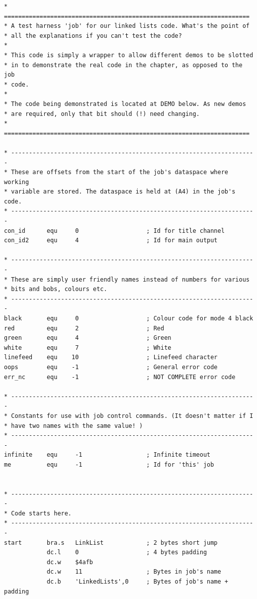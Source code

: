\begin{lstlisting}[firstnumber=1,caption={Linked Lists - Wrapper - Part 1},label={LinkedListsWrapperPart1}]
* =====================================================================
* A test harness 'job' for our linked lists code. What's the point of
* all the explanations if you can't test the code?
*
* This code is simply a wrapper to allow different demos to be slotted
* in to demonstrate the real code in the chapter, as opposed to the job
* code.
*
* The code being demonstrated is located at DEMO below. As new demos
* are required, only that bit should (!) need changing.
* =====================================================================

* ---------------------------------------------------------------------
* These are offsets from the start of the job's dataspace where working
* variable are stored. The dataspace is held at (A4) in the job's code.
* ---------------------------------------------------------------------
con_id      equ     0                   ; Id for title channel
con_id2     equ     4                   ; Id for main output

* ---------------------------------------------------------------------
* These are simply user friendly names instead of numbers for various
* bits and bobs, colours etc.
* ---------------------------------------------------------------------
black       equ     0                   ; Colour code for mode 4 black
red         equ     2                   ; Red
green       equ     4                   ; Green
white       equ     7                   ; White
linefeed    equ    10                   ; Linefeed character
oops        equ    -1                   ; General error code
err_nc      equ    -1                   ; NOT COMPLETE error code

* ---------------------------------------------------------------------
* Constants for use with job control commands. (It doesn't matter if I
* have two names with the same value! )
* ---------------------------------------------------------------------
infinite    equ     -1                  ; Infinite timeout
me          equ     -1                  ; Id for 'this' job


* ---------------------------------------------------------------------
* Code starts here.
* ---------------------------------------------------------------------
start       bra.s   LinkList            ; 2 bytes short jump
            dc.l    0                   ; 4 bytes padding
            dc.w    $4afb
            dc.w    11                  ; Bytes in job's name
            dc.b    'LinkedLists',0     ; Bytes of job's name + padding


\end{lstlisting}
